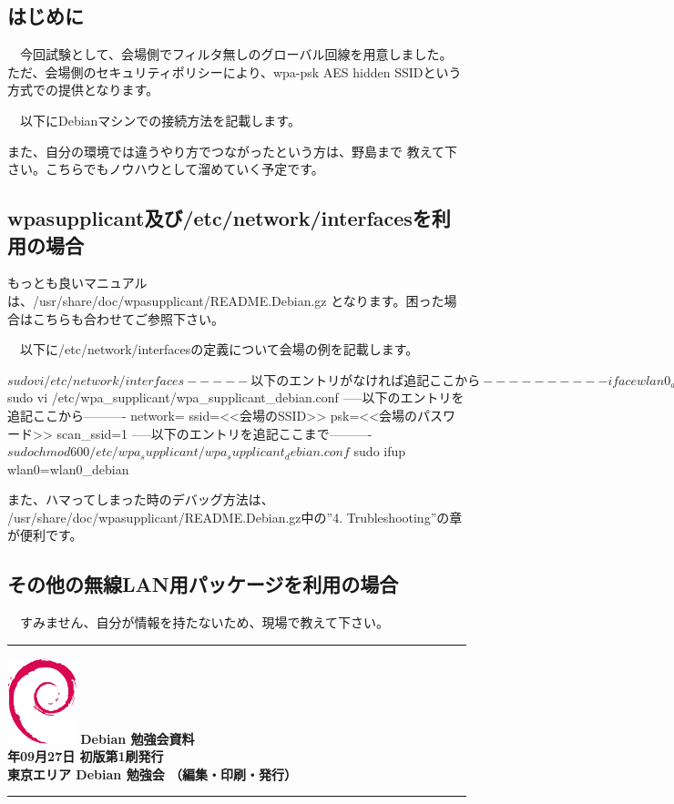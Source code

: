\documentclass[mingoth,a4paper]{jsarticle}
\newcommand{\debmtgyear}{2014}
\newcommand{\debmtgmonth}{09}
\newcommand{\debmtgdate}{27}
\begin{document}
 \subsection{はじめに}

　今回試験として、会場側でフィルタ無しのグローバル回線を用意しました。
ただ、会場側のセキュリティポリシーにより、wpa-psk AES hidden SSIDという
方式での提供となります。

　以下にDebianマシンでの接続方法を記載します。

 また、自分の環境では違うやり方でつながったという方は、野島まで
教えて下さい。こちらでもノウハウとして溜めていく予定です。

 \subsection{wpasupplicant及び/etc/network/interfacesを利用の場合}

 もっとも良いマニュアルは、/usr/share/doc/wpasupplicant/README.Debian.gz
となります。困った場合はこちらも合わせてご参照下さい。

　以下に/etc/network/interfacesの定義について会場の例を記載します。

\begin{commandline}
$ sudo vi /etc/network/interfaces
-----以下のエントリがなければ追記ここから----------
iface wlan0_debian inet dhcp
     wpa-conf /etc/wpa_supplicant/wpa_supplicant_debian.conf
-----以下のエントリがなければ追記ここまで----------
$ sudo vi /etc/wpa_supplicant/wpa_supplicant_debian.conf
-----以下のエントリを追記ここから----------
network={
     ssid=<<会場のSSID>>
     psk=<<会場のパスワード>>
     scan_ssid=1
}
-----以下のエントリを追記ここまで----------
$ sudo chmod 600 /etc/wpa_supplicant/wpa_supplicant_debian.conf
$ sudo ifup wlan0=wlan0_debian
\end{commandline}

 また、ハマってしまった時のデバッグ方法は、
/usr/share/doc/wpasupplicant/README.Debian.gz中の''4. Trubleshooting''の章が便利です。

 \subsection{その他の無線LAN用パッケージを利用の場合}

　すみません、自分が情報を持たないため、現場で教えて下さい。

\newpage
{}
\newpage
{}

\cleartooddpage

\vspace*{15cm}
\hrule
\vspace{2mm}
\includegraphics[width=2cm]{image200502/openlogo-nd.eps}
\noindent \Large \bf Debian 勉強会資料\\
\noindent \normalfont \debmtgyear{}年\debmtgmonth{}月\debmtgdate{}日 \hspace{5mm}  初版第1刷発行\\
\noindent \normalfont 東京エリア Debian 勉強会 （編集・印刷・発行）\\
\hrule
\end{document}

